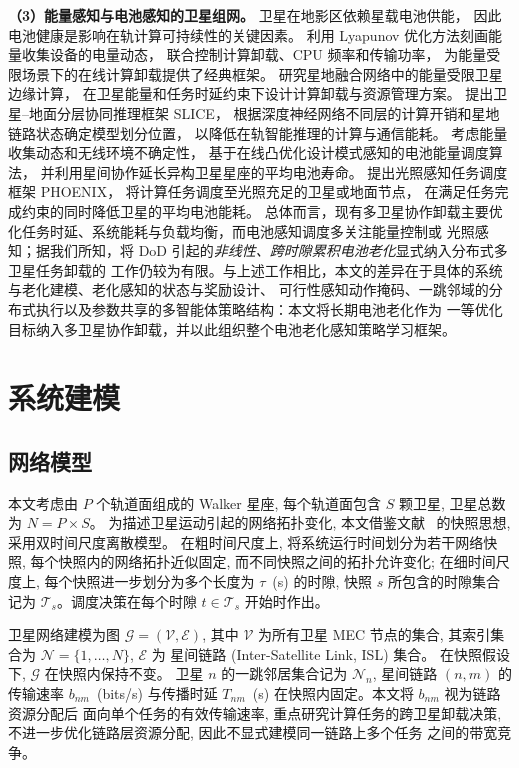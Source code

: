 \documentclass[a4paper,11pt]{article}
\begin{document}
\noindent\textbf{（3）能量感知与电池感知的卫星组网。}
卫星在地影区依赖星载电池供能，
因此电池健康是影响在轨计算可持续性的关键因素。
\cite{mao2016eh}利用 Lyapunov 优化方法刻画能量收集设备的电量动态，
联合控制计算卸载、CPU 频率和传输功率，
为能量受限场景下的在线计算卸载提供了经典框架。
\cite{energyconstrained}研究星地融合网络中的能量受限卫星边缘计算，
在卫星能量和任务时延约束下设计计算卸载与资源管理方案。
\cite{chen2025slice}提出卫星--地面分层协同推理框架 SLICE，
根据深度神经网络不同层的计算开销和星地链路状态确定模型划分位置，
以降低在轨智能推理的计算与通信能耗。
\cite{li2024battery}考虑能量收集动态和无线环境不确定性，
基于在线凸优化设计模式感知的电池能量调度算法，
并利用星间协作延长异构卫星星座的平均电池寿命。
\cite{liu2024phoenix}提出光照感知任务调度框架 PHOENIX，
将计算任务调度至光照充足的卫星或地面节点，
在满足任务完成约束的同时降低卫星的平均电池能耗。
总体而言，现有多卫星协作卸载主要优化任务时延、系统能耗与负载均衡，而电池感知调度多关注能量控制或
光照感知；据我们所知，将 DoD 引起的\emph{非线性、跨时隙累积电池老化}显式纳入分布式多卫星任务卸载的
工作仍较为有限。与上述工作相比，本文的差异在于具体的系统与老化建模、老化感知的状态与奖励设计、
可行性感知动作掩码、一跳邻域的分布式执行以及参数共享的多智能体策略结构：本文将长期电池老化作为
一等优化目标纳入多卫星协作卸载，并以此组织整个电池老化感知策略学习框架。
\section{系统建模}
\label{sec:system_model}

\subsection{网络模型}
\label{subsec:network_model}

本文考虑由 $P$ 个轨道面组成的 Walker 星座, 每个轨道面包含
$S$ 颗卫星, 卫星总数为 $N = P \times S$。
为描述卫星运动引起的网络拓扑变化, 本文借鉴文献~\cite{zhang2024mhspo}
的快照思想, 采用双时间尺度离散模型。
在粗时间尺度上, 将系统运行时间划分为若干网络快照,
每个快照内的网络拓扑近似固定, 而不同快照之间的拓扑允许变化;
在细时间尺度上, 每个快照进一步划分为多个长度为
$\tau$~(s) 的时隙, 快照 $s$ 所包含的时隙集合记为
$\mathcal{T}_s$。调度决策在每个时隙
$t \in \mathcal{T}_s$ 开始时作出。

卫星网络建模为图 $\mathcal{G} = (\mathcal{V}, \mathcal{E})$,
其中 $\mathcal{V}$ 为所有卫星 MEC 节点的集合, 其索引集合为
$\mathcal{N} = \{1, \ldots, N\}$, $\mathcal{E}$ 为
星间链路 (Inter-Satellite Link, ISL) 集合。
在快照假设下, $\mathcal{G}$ 在快照内保持不变。
卫星 $n$ 的一跳邻居集合记为 $\mathcal{N}_n$,
星间链路 $(n, m)$ 的传输速率 $b_{nm}$~(bits/s) 与传播时延
$T_{nm}$~(s) 在快照内固定。本文将 $b_{nm}$ 视为链路资源分配后
面向单个任务的有效传输速率, 重点研究计算任务的跨卫星卸载决策,
不进一步优化链路层资源分配, 因此不显式建模同一链路上多个任务
之间的带宽竞争。
\end{document}
